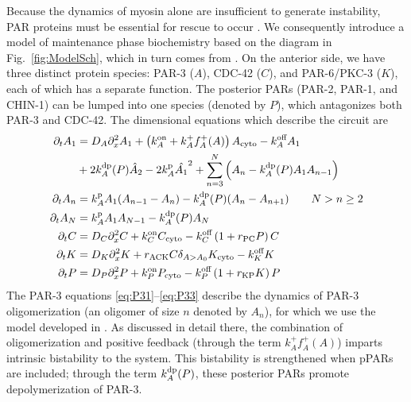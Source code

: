 \documentclass[11pt]{article}
\newcommand{\6}[1]{#1_{\text{6}}}
\newcommand{\3}[1]{#1_{\text{3}}}
\begin{document}
Because the dynamics of myosin alone are insufficient to generate instability, PAR proteins must be essential for rescue to occur \citep{zonies2010symmetry}. We consequently introduce a model of maintenance phase biochemistry based on the diagram in Fig.\ \ref{fig:ModelSch}, which in turn comes from \citep[Fig.~2]{lang2017proteins}. On the anterior side, we have three distinct protein species: PAR-3 ($A$), CDC-42 ($C$), and PAR-6/PKC-3 ($K$), each of which has a separate function. The posterior PARs (PAR-2, PAR-1, and CHIN-1) can be lumped into one species (denoted by $P$), which antagonizes both PAR-3 and CDC-42. The dimensional equations which describe the circuit are 
\begin{subequations}
\label{eq:AllBC}
\begin{align}
\label{eq:P31}
\partial_t A_1 & = D_A \partial_x^2 A_1 + \left(k^\text{on}_A+k^+_A f^+_A(A) \right)A_\text{cyto}- k^\text{off}_A A_1  \\  \nonumber
 &+ 2 k^\text{dp}_A(P) \hat{A}_2-2k^\text{p}_A \hat{A_1}^2+\sum_{n=3}^N \left(A_n-k^\text{dp}_A(P) A_1 A_{n-1}\right)  \\ 
\partial_t A_n & =k^\text{p}_{A}A_1 (A_{n-1}-A_n) -k^\text{dp}_A(P)(A_n-A_{n+1})  \qquad N > n \geq 2 \\ 
\label{eq:P33}
\partial_t A_N & =k^\text{p}_A A_1  A_{N-1}-k^\text{dp}_A(P) A_N \\
\label{eq:Ceqn}
\partial_t C& =D_C \partial_x^2 {C} +k^\text{on}_C C_\text{cyto}  - k^\text{off}_C \left(1+r_\text{PC}P\right)C\\
\label{eq:Keqn}
\partial_t {K}  &= D_K \partial_x^2 {K} + {r}_\text{ACK} {C} \delta_{A > A_0}K_\text{cyto}-k^\text{off}_K K \\
\partial_t {P} & =D_P \partial_x^2 {P} +k^\text{on}_P P_\text{cyto}  - k^\text{off}_P \left(1+{r}_\text{KP}{K}\right){P}
\end{align}
\end{subequations}
The PAR-3 equations \eqref{eq:P31}--\eqref{eq:P33} describe the dynamics of PAR-3 oligomerization  (an oligomer of size $n$ denoted by $A_n$), for which we use the model developed in \citep{lang2023oligomerization}. As discussed in detail there, the combination of oligomerization and positive feedback (through the term $k^+_A f^+_A(A)$) imparts intrinsic bistability to the system. This bistability is strengthened when pPARs are included; through the term $k^\text{dp}_A(P)$, these posterior PARs promote depolymerization of PAR-3.
\end{document}
